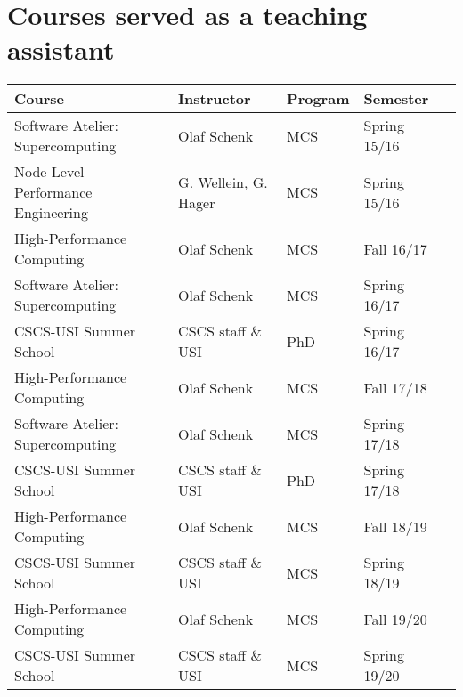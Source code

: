 \chapter{Courses served as a teaching assistant}
\label{a:ta}

\centering
\begin{tabular}{lllll}
\hline
Course                               & Instructor             & Program & Semester  \\ \hline
Software Atelier: Supercomputing & Olaf Schenk & MCS & Spring 15/16 \\
Node-Level Performance Engineering & G. Wellein, G. Hager & MCS & Spring 15/16 \\
High-Performance Computing & Olaf Schenk & MCS & Fall 16/17 \\
Software Atelier: Supercomputing & Olaf Schenk & MCS & Spring 16/17 \\
CSCS-USI Summer School & CSCS staff \& USI & PhD & Spring 16/17 \\
High-Performance Computing & Olaf Schenk & MCS & Fall 17/18 \\
Software Atelier: Supercomputing & Olaf Schenk & MCS & Spring 17/18 \\
CSCS-USI Summer School & CSCS staff \& USI & PhD & Spring 17/18 \\
High-Performance Computing & Olaf Schenk & MCS & Fall 18/19 \\
CSCS-USI Summer School & CSCS staff \& USI & MCS & Spring 18/19 \\
High-Performance Computing & Olaf Schenk & MCS & Fall 19/20	\\
CSCS-USI Summer School & CSCS staff \& USI & MCS & Spring 19/20 \\ \hline
 \hline
\end{tabular}
